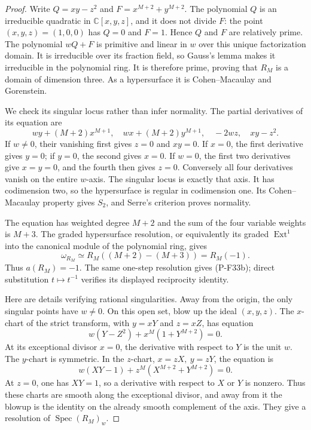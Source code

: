 \begin{proof}
Write $Q=xy-z^2$ and $F=x^{M+2}+y^{M+2}$.
The polynomial $Q$ is an irreducible quadratic in
$\mathbb C[x,y,z]$, and it does not divide $F$:
the point $(x,y,z)=(1,0,0)$ has $Q=0$ and $F=1$.
Hence $Q$ and $F$ are relatively prime. The polynomial
$wQ+F$ is primitive and linear in $w$ over this
unique factorization domain. It is irreducible over
its fraction field, so Gauss's lemma makes it
irreducible in the polynomial ring. It is therefore
prime, proving that $R_M$ is a domain of dimension three.
As a hypersurface it is Cohen--Macaulay and Gorenstein.

We check its singular locus rather than infer normality.
The partial derivatives of its equation are
\[
 wy+(M+2)x^{M+1},\quad
 wx+(M+2)y^{M+1},\quad -2wz,\quad xy-z^2.
 \tag{P-F33e}
\]
If $w\ne0$, their vanishing first gives $z=0$ and
$xy=0$. If $x=0$, the first derivative gives $y=0$;
if $y=0$, the second gives $x=0$.
If $w=0$, the first two derivatives give $x=y=0$,
and the fourth then gives $z=0$.
Conversely all four derivatives vanish on the entire
$w$-axis. The singular locus is exactly that axis.
It has codimension two, so the hypersurface is regular
in codimension one. Its Cohen--Macaulay property gives
$S_2$, and Serre's criterion proves normality.

The equation has weighted degree $M+2$ and the sum
of the four variable weights is $M+3$. The graded
hypersurface resolution, or equivalently its graded
$\operatorname{Ext}^1$ into the canonical module
of the polynomial ring, gives
\[
 \omega_{R_M}\simeq R_M((M+2)-(M+3))=R_M(-1).
 \tag{P-F33f}
\]
Thus $a(R_M)=-1$. The same one-step resolution
gives (P-F33b); direct substitution $t\mapsto t^{-1}$
verifies its displayed reciprocity identity.

Here are details verifying rational singularities.
Away from the origin, the only singular points
have $w\ne0$. On this open set, blow up the ideal
$(x,y,z)$. The $x$-chart of the strict transform,
with $y=xY$ and $z=xZ$, has equation
\[
 w(Y-Z^2)+x^M(1+Y^{M+2})=0.
 \tag{P-F33g}
\]
At its exceptional divisor $x=0$, the derivative
with respect to $Y$ is the unit $w$.
The $y$-chart is symmetric. In the $z$-chart,
$x=zX,\ y=zY$, the equation is
\[
 w(XY-1)+z^M(X^{M+2}+Y^{M+2})=0.
 \tag{P-F33h}
\]
At $z=0$, one has $XY=1$, so a derivative with
respect to $X$ or $Y$ is nonzero. Thus these charts
are smooth along the exceptional divisor, and
away from it the blowup is the identity on the
already smooth complement of the axis.
They give a resolution of $\operatorname{Spec}(R_M)_w$.


\end{proof}
